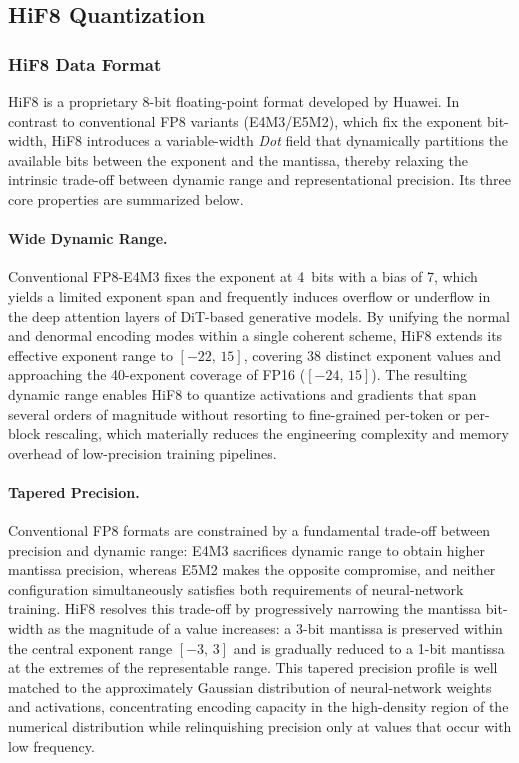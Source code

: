 \subsection{HiF8 Quantization}

\subsubsection{HiF8 Data Format}

HiF8 is a proprietary 8-bit floating-point format developed by Huawei.
In contrast to conventional FP8 variants (E4M3/E5M2), which fix the exponent
bit-width, HiF8 introduces a variable-width \emph{Dot} field that dynamically
partitions the available bits between the exponent and the mantissa, thereby
relaxing the intrinsic trade-off between dynamic range and representational
precision.
Its three core properties are summarized below.

\paragraph{Wide Dynamic Range.}
Conventional FP8-E4M3 fixes the exponent at 4~bits with a bias of 7, which yields
a limited exponent span and frequently induces overflow or underflow in the deep
attention layers of DiT-based generative models.
By unifying the normal and denormal encoding modes within a single coherent
scheme, HiF8 extends its effective exponent range to $[-22,\,15]$, covering 38
distinct exponent values and approaching the 40-exponent coverage of FP16
($[-24,\,15]$).
The resulting dynamic range enables HiF8 to quantize activations and gradients
that span several orders of magnitude without resorting to fine-grained
per-token or per-block rescaling, which materially reduces the engineering
complexity and memory overhead of low-precision training pipelines.

\paragraph{Tapered Precision.}
Conventional FP8 formats are constrained by a fundamental trade-off between
precision and dynamic range: E4M3 sacrifices dynamic range to obtain higher
mantissa precision, whereas E5M2 makes the opposite compromise, and neither
configuration simultaneously satisfies both requirements of neural-network
training.
HiF8 resolves this trade-off by progressively narrowing the mantissa bit-width
as the magnitude of a value increases: a 3-bit mantissa is preserved within the
central exponent range $[-3,\,3]$ and is gradually reduced to a 1-bit mantissa
at the extremes of the representable range.
This tapered precision profile is well matched to the approximately Gaussian
distribution of neural-network weights and activations, concentrating encoding
capacity in the high-density region of the numerical distribution while
relinquishing precision only at values that occur with low frequency.


